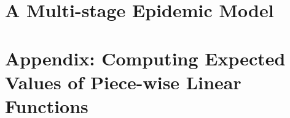 \documentclass[twoside,USenglish,10pt]{article}
\begin{document}
\section{A Multi-stage Epidemic Model}\label{sc:multi}













\appendix

\section{Appendix: Computing Expected Values of Piece-wise Linear Functions} \label{app:piecewise}
\end{document}
